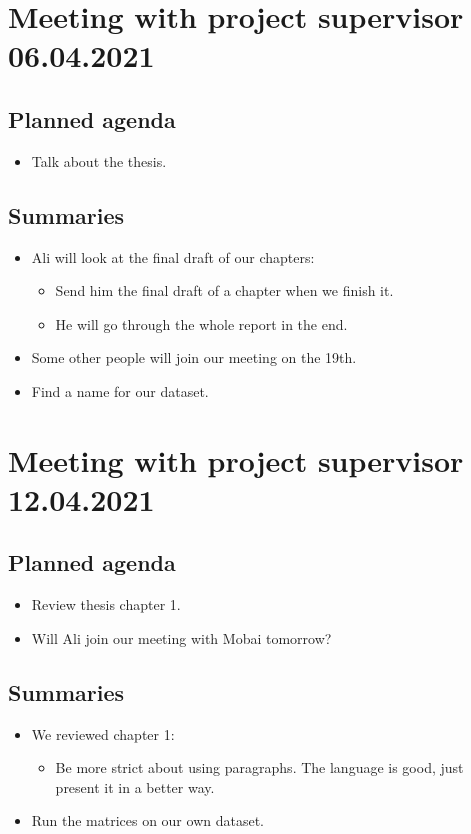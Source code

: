 \newpage

\section*{Meeting with project supervisor 06.04.2021}
\subsection*{Planned agenda}
\begin{itemize}
    \item Talk about the thesis.
\end{itemize}

\subsection*{Summaries}
\begin{itemize}
    \item Ali will look at the final draft of our chapters: 
    \begin{itemize}
        \item Send him the final draft of a chapter when we finish it. 
        \item He will go through the whole report in the end.
    \end{itemize}
    \item Some other people will join our meeting on the 19th.
    \item Find a name for our dataset.
\end{itemize}

\newpage

\section*{Meeting with project supervisor 12.04.2021}
\subsection*{Planned agenda}
\begin{itemize}
    \item Review thesis chapter 1.
    \item Will Ali join our meeting with Mobai tomorrow?
\end{itemize}

\subsection*{Summaries}
\begin{itemize}
    \item We reviewed chapter 1:
    \begin{itemize}
        \item Be more strict about using paragraphs. The language is good, just present it in a better way.
    \end{itemize}
    \item Run the matrices on our own dataset. 
\end{itemize}

